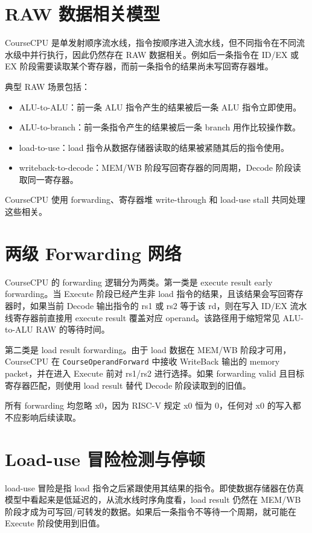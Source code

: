 \documentclass[UTF8,a4paper,12pt]{ctexrep}
\begin{document}
\section{RAW 数据相关模型}

CourseCPU 是单发射顺序流水线，指令按顺序进入流水线，但不同指令在不同流水级中并行执行，因此仍然存在 RAW 数据相关。例如后一条指令在 ID/EX 或 EX 阶段需要读取某个寄存器，而前一条指令的结果尚未写回寄存器堆。

典型 RAW 场景包括：

\begin{itemize}
  \item ALU-to-ALU：前一条 ALU 指令产生的结果被后一条 ALU 指令立即使用。
  \item ALU-to-branch：前一条指令产生的结果被后一条 branch 用作比较操作数。
  \item load-to-use：load 指令从数据存储器读取的结果被紧随其后的指令使用。
  \item writeback-to-decode：MEM/WB 阶段写回寄存器的同周期，Decode 阶段读取同一寄存器。
\end{itemize}

CourseCPU 使用 forwarding、寄存器堆 write-through 和 load-use stall 共同处理这些相关。

\section{两级 Forwarding 网络}

CourseCPU 的 forwarding 逻辑分为两类。第一类是 execute result early forwarding。当 Execute 阶段已经产生非 load 指令的结果，且该结果会写回寄存器时，如果当前 Decode 输出指令的 rs1 或 rs2 等于该 rd，则在写入 ID/EX 流水线寄存器前直接用 execute result 覆盖对应 operand。该路径用于缩短常见 ALU-to-ALU RAW 的等待时间。

第二类是 load result forwarding。由于 load 数据在 MEM/WB 阶段才可用，CourseCPU 在 \texttt{CourseOperandForward} 中接收 WriteBack 输出的 memory packet，并在进入 Execute 前对 rs1/rs2 进行选择。如果 forwarding valid 且目标寄存器匹配，则使用 load result 替代 Decode 阶段读取到的旧值。

所有 forwarding 均忽略 x0，因为 RISC-V 规定 x0 恒为 0，任何对 x0 的写入都不应影响后续读取。

\section{Load-use 冒险检测与停顿}

load-use 冒险是指 load 指令之后紧跟使用其结果的指令。即使数据存储器在仿真模型中看起来是低延迟的，从流水线时序角度看，load result 仍然在 MEM/WB 阶段才成为可写回/可转发的数据。如果后一条指令不等待一个周期，就可能在 Execute 阶段使用到旧值。
\end{document}
